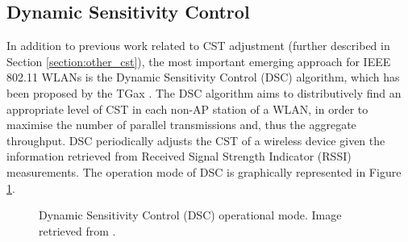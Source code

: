 \documentclass[12pt, a4paper,twoside]{tesi_upf}
\begin{document}
			\subsection{Dynamic Sensitivity Control}
			\label{section:dsc}		
				In addition to previous work related to CST adjustment (further described in Section \ref{section:other_cst}), the most important emerging approach for IEEE 802.11 WLANs is the Dynamic Sensitivity Control (DSC) algorithm, which has been proposed by the TGax \cite{smith2015dynamic}. The DSC algorithm aims to distributively find an appropriate level of CST in each non-AP station of a WLAN, in order to maximise the number of parallel transmissions and, thus the aggregate throughput. DSC periodically adjusts the CST of a wireless device given the information retrieved from Received Signal Strength Indicator (RSSI) measurements. The operation mode of DSC is graphically represented in Figure \ref{fig:dsc_flowchart}.				
				\begin{figure}[t!]
					\centering
					\caption{Dynamic Sensitivity Control (DSC) operational mode. Image retrieved from \cite{afaqui2015evaluation}.}
					\label{fig:dsc_flowchart}
				\end{figure}
\end{document}
